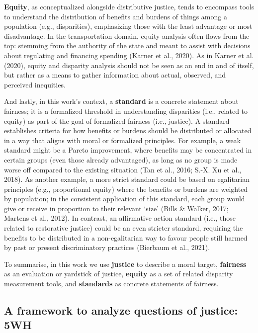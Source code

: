 \documentclass[
  letterpaper,
  DIV=11,
  numbers=noendperiod]{scrartcl}
\begin{document}
\textbf{Equity}, as conceptualized alongside distributive justice, tends
to encompass tools to understand the distribution of benefits and
burdens of things among a population (e.g., disparities), emphasizing
those with the least advantage or most disadvantage. In the
transportation domain, equity analysis often flows from the top:
stemming from the authority of the state and meant to assist with
decisions about regulating and financing spending (Karner et al., 2020).
As in Karner et al. (2020), equity and disparity analysis should not be
seen as an end in and of itself, but rather as a means to gather
information about actual, observed, and perceived inequities.

And lastly, in this work's context, a \textbf{standard} is a concrete
statement about fairness; it is a formalized threshold in understanding
disparities (i.e., related to equity) as part of the goal of formalized
fairness (i.e., justice). A standard establishes criteria for how
benefits or burdens should be distributed or allocated in a way that
aligns with moral or formalized principles. For example, a weak standard
might be a Pareto improvement, where benefits may be concentrated in
certain groups (even those already advantaged), as long as no group is
made worse off compared to the existing situation (Tan et al., 2016;
S.-X. Xu et al., 2018). As another example, a more strict standard could
be based on egalitarian principles (e.g., proportional equity) where the
benefits or burdens are weighted by population; in the consistent
application of this standard, each group would give or receive in
proportion to their relevant `size' (Bills \& Walker, 2017; Martens et
al., 2012). In contrast, an affirmative action standard (i.e., those
related to restorative justice) could be an even stricter standard,
requiring the benefits to be distributed in a non-egalitarian way to
favour people still harmed by past or present discriminatory practices
(Bierbaum et al., 2021).

To summarise, in this work we use \textbf{justice} to describe a moral
target, \textbf{fairness} as an evaluation or yardstick of justice,
\textbf{equity} as a set of related disparity measurement tools, and
\textbf{standards} as concrete statements of fairness.

\subsection{A framework to analyze questions of justice:
5WH}\label{a-framework-to-analyze-questions-of-justice-5wh}
\end{document}
